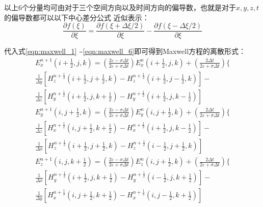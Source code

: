  以上6个分量均可由对于三个空间方向以及时间方向的偏导数，也就是对于$x, y, z, t$的偏导数都可以以下中心差分公式
 近似表示：
 \begin{equation} 
 \frac{\partial f(\xi)}{\partial \xi}=\frac{\partial f(\xi+\Delta \xi / 2)}{\partial \xi}-\frac{\partial f(\xi-\Delta \xi / 2)}{\partial \xi}
  \end{equation}

代入式\ref{eqn:maxwell_1} \textasciitilde \ref{eqn:maxwell_6}即可得到Maxwell方程的离散形式：
\begin{equation} 
\begin{array}{l}{E_{x}^{n+1}\left(i+\frac{1}{2}, j, k\right)=\left(\frac{2 \varepsilon-\sigma \Delta t}{2 \varepsilon+\sigma \Delta t}\right) E_{x}^{n}\left(i+\frac{1}{2}, j, k\right)+\left(\frac{2 \Delta t}{2 \varepsilon+\sigma \Delta t}\right)\{ } \\ {\frac{1}{\Delta y}\left[H_{z}^{n+\frac{1}{2}}\left(i+\frac{1}{2}, j+\frac{1}{2}, k\right)-H_{z}^{n+\frac{1}{2}}\left(i+\frac{1}{2}, j-\frac{1}{2}, k\right)\right]-} \\ {\frac{1}{\Delta z}\left[H_{y}^{n+\frac{1}{2}}\left(i+\frac{1}{2}, j, k+\frac{1}{2}\right)-H_{y}^{n+\frac{1}{2}}\left(i+\frac{1}{2}, j, k-\frac{1}{2}\right)\right]}\end{array}
 \end{equation}
 \begin{equation} 
\begin{array}{l}{E_{y}^{n+1}\left(i, j+\frac{1}{2}, k\right)=\left(\frac{2 \varepsilon-\sigma \Delta t}{2 \varepsilon+\sigma \Delta t}\right) E_{y}^{n}\left(i, j+\frac{1}{2}, k\right)+\left(\frac{2 \Delta t}{2 \varepsilon+\sigma \Delta t}\right)\{ } \\ {\frac{1}{\Delta z}\left[H_{x}^{n+\frac{1}{2}}\left(i, j+\frac{1}{2}, k+\frac{1}{2}\right)-H_{x}^{n+\frac{1}{2}}\left(i+\frac{1}{2}, j, k-\frac{1}{2}\right)\right]-} \\ {\frac{1}{\Delta x}\left[H_{z}^{n+\frac{1}{2}}\left(i+\frac{1}{2}, j+\frac{1}{2}, k\right)-H_{z}^{n+\frac{1}{2}}\left(i-\frac{1}{2}, j+\frac{1}{2}, k\right)\right]}\end{array}
 \end{equation}
 \begin{equation} 
\begin{array}{l}{E_{z}^{n+1}\left(i, j, k+\frac{1}{2}\right)=\left(\frac{2 \varepsilon-\sigma \Delta t}{2 \varepsilon+\sigma \Delta t}\right) E_{z}^{n}\left(i, j+\frac{1}{2}, k\right)+\left(\frac{2 \Delta t}{2 \varepsilon+\sigma \Delta t}\right)\{ } \\ {\frac{1}{\Delta x}\left[H_{y}^{n+\frac{1}{2}}\left(i+\frac{1}{2}, j, k+\frac{1}{2}\right)-H_{y}^{n+\frac{1}{2}}\left(i-\frac{1}{2}, j, k+\frac{1}{2}\right)\right]-} \\ {\frac{1}{\Delta y}\left[H_{x}^{n+\frac{1}{2}}\left(i, j+\frac{1}{2}, k+\frac{1}{2}\right)-H_{x}^{n+\frac{1}{2}}\left(i, j-\frac{1}{2}, k+\frac{1}{2}\right)\right]}\end{array}
 \end{equation}
